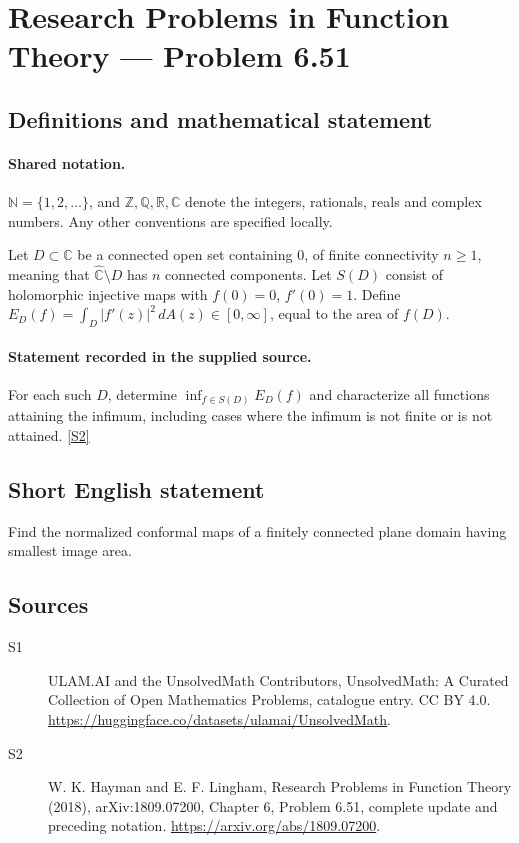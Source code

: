 \documentclass[11pt]{article}
\newcommand{\sref}[2]{\hyperlink{source:#1:#2}{[S#2]}}
\begin{document}
\section{Research Problems in Function Theory — Problem 6.51}\label{statement}

\subsection{Definitions and mathematical statement}

\paragraph{Shared notation.}$\mathbb N=\{1,2,\ldots\}$, and $\mathbb Z,\mathbb Q,\mathbb R,\mathbb C$ denote the integers, rationals, reals and complex numbers. Any other conventions are specified locally.


Let $D\subset\mathbb C$ be a connected open set containing $0$, of finite connectivity $n\ge1$, meaning that $\widehat{\mathbb C}\setminus D$ has $n$ connected components. Let $S(D)$ consist of holomorphic injective maps with $f(0)=0$, $f'(0)=1$. Define $E_D(f)=\int_D|f'(z)|^2\,dA(z)\in[0,\infty]$, equal to the area of $f(D)$.
\paragraph{Statement recorded in the supplied source.}
For each such $D$, determine $\inf_{f\in S(D)}E_D(f)$ and characterize all functions attaining the infimum, including cases where the infimum is not finite or is not attained. \sref{statement}{2}
\subsection{Short English statement}
Find the normalized conformal maps of a finitely connected plane domain having smallest image area.
\subsection{Sources}
\begin{description}
\item[\hypertarget{source:statement:1}{S1}] ULAM.AI and the UnsolvedMath Contributors, UnsolvedMath: A Curated Collection of Open Mathematics Problems, catalogue entry. CC BY 4.0. \url{https://huggingface.co/datasets/ulamai/UnsolvedMath}.
\item[\hypertarget{source:statement:2}{S2}] W. K. Hayman and E. F. Lingham, Research Problems in Function Theory (2018), arXiv:1809.07200, Chapter 6, Problem 6.51, complete update and preceding notation. \url{https://arxiv.org/abs/1809.07200}.
\end{description}
\label{end:statement}
\end{document}
